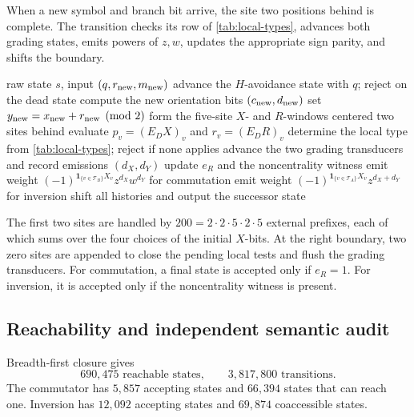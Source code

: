 \documentclass[10pt,letterpaper]{article}
\begin{document}
When a new symbol and branch bit arrive, the site two positions behind is complete.  The transition checks its row of \cref{tab:local-types}, advances both grading states, emits powers of \(z,w\), updates the appropriate sign parity, and shifts the boundary.

\begin{algorithm}[t]
\caption{One coefficient-automaton transition}\label{alg:coefficient-transition}
\begin{algorithmic}[1]
\Require raw state \(s\), input \((q,r_{\rm new},m_{\rm new})\)
\State advance the \(H\)-avoidance state with \(q\); reject on the dead state
\State compute the new orientation bits \((c_{\rm new},d_{\rm new})\)
  \State set \(y_{\rm new}=x_{\rm new}+r_{\rm new}\pmod2\)
  \State form the five-site \(X\)- and \(R\)-windows centered two sites behind
  \State evaluate \(p_v=(E_DX)_v\) and \(r_v=(E_DR)_v\)
  \State determine the local type from \cref{tab:local-types}; reject if none applies
  \State advance the two grading transducers and record emissions \((d_X,d_Y)\)
  \State update \(e_R\) and the noncentrality witness
  \State emit weight \((-1)^{\mathbf1_{\{v\in\mathcal T_B\}}X_v}z^{d_X}w^{d_Y}\) for commutation
  \State emit weight \((-1)^{\mathbf1_{\{v\in\mathcal T_A\}}X_v}z^{d_X+d_Y}\) for inversion
  \State shift all histories and output the successor state
\EndFor
\end{algorithmic}
\end{algorithm}

The first two sites are handled by \(200=2\cdot2\cdot5\cdot2\cdot5\) external prefixes, each of which sums over the four choices of the initial \(X\)-bits.  At the right boundary, two zero sites are appended to close the pending local tests and flush the grading transducers.  For commutation, a final state is accepted only if \(e_R=1\).  For inversion, it is accepted only if the noncentrality witness is present.

\subsection{Reachability and independent semantic audit}

Breadth-first closure gives
\begin{equation}\label{eq:raw-counts}
 690{,}475\text{ reachable states},
 \qquad
 3{,}817{,}800\text{ transitions}.
\end{equation}
The commutator has \(5{,}857\) accepting states and \(66{,}394\) states that can reach one.  Inversion has \(12{,}092\) accepting states and \(69{,}874\) coaccessible states.
\end{document}
